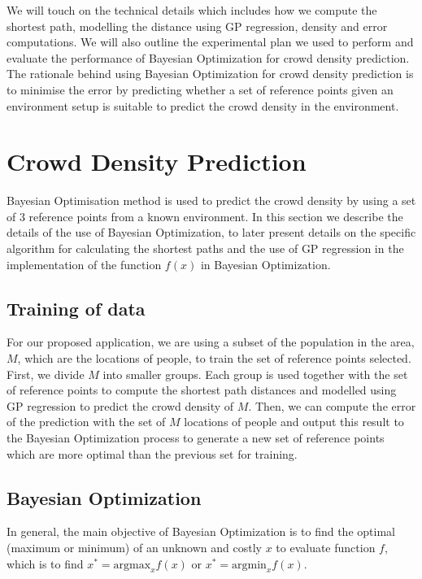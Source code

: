 \documentclass[letterpaper]{article}
\begin{document}
We will touch on the technical details which includes how we compute the shortest path, modelling the distance using GP regression, density and error computations. We will also outline the experimental plan we used to perform and evaluate the performance of Bayesian Optimization for crowd density prediction. \\

The rationale behind using Bayesian Optimization for crowd density prediction is to minimise the error by predicting whether a set of reference points given an environment setup is suitable to predict the crowd density in the environment.

\section{Crowd Density Prediction}

Bayesian Optimisation method is used to predict the crowd density by using a set of $3$ reference points from a known environment. In this section we describe the details of the use of Bayesian Optimization, to later present details on the specific algorithm for calculating the shortest paths and the use of GP regression in the implementation of the function $f(x)$ in Bayesian Optimization.

\subsection{Training of data}

For our proposed application, we are using a subset of the population in the area, $M$, which are the locations of people, to train the set of reference points selected. First, we divide $M$ into smaller groups. Each group is used together with the set of reference points to compute the shortest path distances and modelled using GP regression to predict the crowd density of $M$. Then, we can compute the error of the prediction with the set of $M$ locations of people and output this result to the Bayesian Optimization process to generate a new set of reference points which are more optimal than the previous set for training.

\subsection{Bayesian Optimization}

In general, the main objective of Bayesian Optimization is to find the optimal (maximum or minimum) of an unknown and costly $x$ to evaluate function $f$, which is to find $x^* = \text{argmax}_x f(x)$ or $x^* = \text{argmin}_x f(x)$. \\
\end{document}
